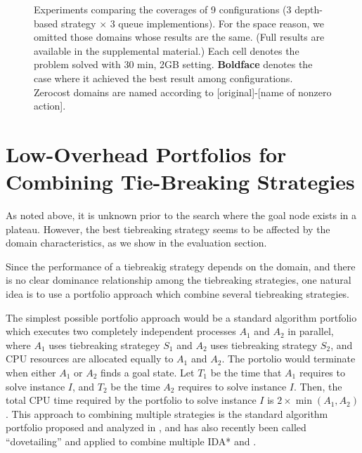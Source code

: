 \begin{figure}[htb]
 \centering
 
 \caption{Experiments
 comparing the coverages of 9 configurations (3 depth-based strategy
 $\times$ 3 queue implementions). For the space reason, we omitted those
 domains whose results are the same. (Full results are available in the
 supplemental material.) Each cell denotes the problem solved with 30
 min, 2GB setting. \textbf{Boldface} denotes the case where it achieved
 the best result among configurations. Zerocost domains are named
 according to [original]-[name of nonzero action].}
 \label{depth}
\end{figure}

%  

\section{Low-Overhead Portfolios for Combining Tie-Breaking Strategies}

As noted above, it is unknown prior to the search where the goal node
exists in a plateau.
However, the best tiebreaking strategy seems to be affected by the domain
characteristics, as we show in the evaluation section.

Since the performance of a tiebreakig strategy depends on the domain, and there is no clear dominance relationship among the tiebreaking strategies, one natural 
idea is to use a portfolio approach which combine several tiebreaking strategies.

The simplest possible portfolio approach would be a standard algorithm portfolio
which executes two completely independent \astar processes $A_1$ and $A_2$ in parallel, where $A_1$ uses tiebreaking strategey $S_1$ and $A_2$ uses tiebreaking strategy $S_2$, and CPU resources are allocated equally to $A_1$ and $A_2$.
The portolio would terminate when either $A_1$ or $A_2$ finds a goal state.
Let $T_1$ be the time that $A_1$ requires to solve instance $I$, and $T_2$ be the
time $A_2$ requires to solve instance $I$. Then, the total CPU time
required by the portfolio to solve instance $I$ is $2\times\min(A_1,A_2)$. This approach to combining multiple strategies is the standard algorithm portfolio proposed and analyzed in \cite{HubermanLH97,GomesS01}, and has also recently been called ``dovetailing'' and applied to combine multiple IDA* and \astar  \cite{ValenzanoSSBK10}. %

